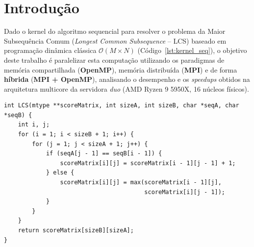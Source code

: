 \section{Introdução}
\label{sec:introducao}

Dado o kernel do algoritmo sequencial para resolver o problema da Maior Subsequência Comum (\textit{Longest Common Subsequence} -- LCS) baseado em programação dinâmica clássica $\mathcal{O}(M \times N)$ (Código~\ref{lst:kernel_seq}), o objetivo deste trabalho é paralelizar esta computação utilizando os paradigmas de memória compartilhada (\textbf{OpenMP}), memória distribuída (\textbf{MPI}) e de forma \textbf{híbrida} (\textbf{MPI + OpenMP}), analisando o desempenho e os \textit{speedups} obtidos na arquitetura multicore da servidora \textit{duo} (AMD Ryzen 9 5950X, 16 núcleos físicos).

\begin{lstlisting}[caption={Kernel sequencial do algoritmo LCS em linguagem C.}, label={lst:kernel_seq}]
int LCS(mtype **scoreMatrix, int sizeA, int sizeB, char *seqA, char *seqB) {
    int i, j;
    for (i = 1; i < sizeB + 1; i++) {
        for (j = 1; j < sizeA + 1; j++) {
            if (seqA[j - 1] == seqB[i - 1]) {
                scoreMatrix[i][j] = scoreMatrix[i - 1][j - 1] + 1;
            } else {
                scoreMatrix[i][j] = max(scoreMatrix[i - 1][j], 
                                        scoreMatrix[i][j - 1]);
            }
        }
    }
    return scoreMatrix[sizeB][sizeA];
}
\end{lstlisting}
